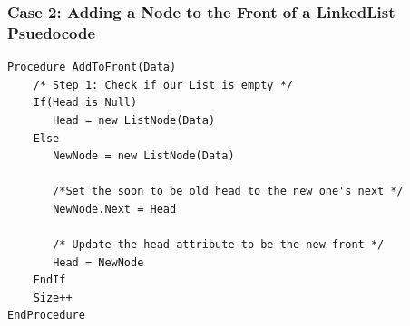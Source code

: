 \documentclass{beamer}
\begin{document}
\begin{frame}[fragile]
    \frametitle{Case 2: Adding a Node to the Front of a LinkedList Psuedocode}
    \vfill
    \centering
    \begin{lstlisting}[frame=trBL]
Procedure AddToFront(Data)
    /* Step 1: Check if our List is empty */
    If(Head is Null)
       Head = new ListNode(Data)
    Else
       NewNode = new ListNode(Data)

       /*Set the soon to be old head to the new one's next */
       NewNode.Next = Head

       /* Update the head attribute to be the new front */
       Head = NewNode
    EndIf
    Size++
EndProcedure
    \end{lstlisting}
    \vfill
\end{frame}
\end{document}
